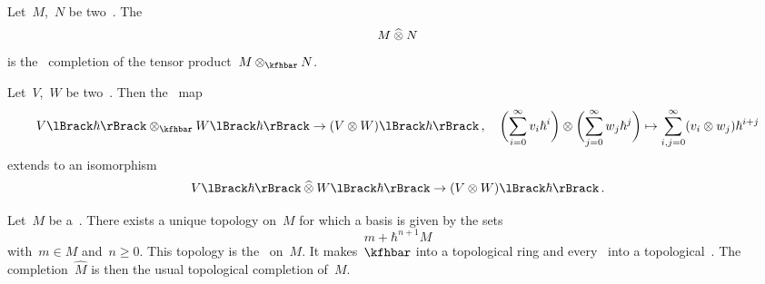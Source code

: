 \documentclass[a4paper, 11pt, oneside]{scrartcl}
\begin{document}
\begin{definition}
  Let~$M$,~$N$ be two~\modules{$\kfhbar$}.
  The 
  \[
    M \mathbin{\widehat{\otimes}} N
  \]
  is the~\adic{$\hbar$} completion of the tensor product~$M \tensor_{\kfhbar} N$.
\end{definition}


\begin{proposition}
  Let~$V$,~$W$ be two~\vectorspaces{$\kf$}.
  Then the~\linear{$\kfhbar$} map
  \[
    \power{V}{\hbar} \tensor_{\kfhbar} \power{W}{\hbar}
    \to
    \power{(V \tensor W)}{\hbar} \,,
    \quad
    \biggl( \sum_{i=0}^\infty v_i \hbar^i \biggr)
    \tensor
    \biggl( \sum_{j=0}^\infty w_j \hbar^j \biggr)
    \mapsto
    \sum_{i,j=0}^\infty (v_i \tensor w_j) \hbar^{i+j}
  \]
  extends to an isomorphism
  \[
    \power{V}{\hbar} \ctensor \power{W}{\hbar}
    \to
    \power{(V \tensor W)}{\hbar} \,.
  \]
\end{proposition}

\begin{remark}
  Let~$M$ be a~\module{$\kfhbar$}.
  There exists a unique topology on~$M$ for which a basis is given by the sets
  \[
    m + \hbar^{n+1} M
  \]
  with~$m \in M$ and~$n \geq 0$.
  This topology is the~ on~$M$.
  It makes~$\kfhbar$ into a topological ring and every~\module{$\kfhbar$} into a topological~\module{$\kfhbar$}.
  The completion~$\widehat{M}$ is then the usual topological completion of~$M$.
\end{remark}
\end{document}
